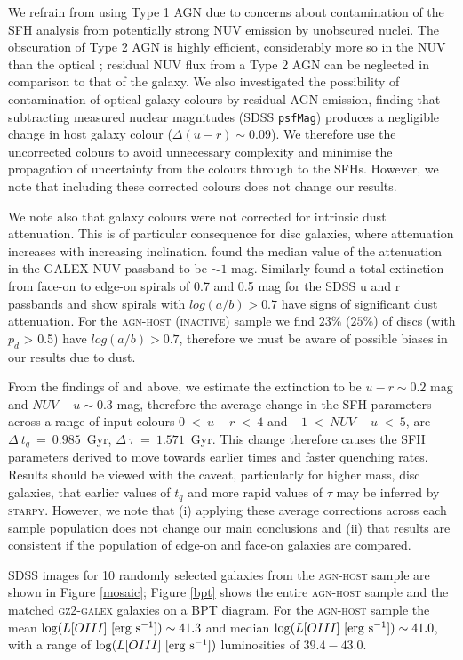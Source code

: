 \documentclass[useAMS,usenatbib]{mn2e}
\def\changed    {\color{nc} }
\def\secondchange    {\color{srv} }
\def\newref    {\color{new} }
\begin{document}
{\changed We refrain from using Type 1 AGN due to concerns about contamination of the SFH analysis from potentially strong NUV emission by unobscured nuclei. The obscuration of Type 2 AGN is highly efficient, considerably more so in the NUV than the optical \citep{Simmons11}; residual NUV flux from a Type 2 AGN can be neglected in comparison to that of the galaxy. We also investigated the possibility of contamination of optical galaxy colours by residual AGN emission, finding that subtracting measured nuclear magnitudes (SDSS {\tt psfMag}) produces a negligible change in host galaxy colour ($\Delta(u-r) \sim 0.09$)}. We therefore use the uncorrected colours to avoid unnecessary complexity and minimise the propagation of uncertainty from the colours through to the SFHs. {\changed However, we note that including these corrected colours does not change our results.}  

{\secondchange We note also that galaxy colours were not corrected for intrinsic dust attenuation. This is of particular consequence for disc galaxies, where attenuation increases with increasing inclination. \cite{Buat05} found the median value of the attenuation in the GALEX NUV passband to be $\sim 1$ mag. Similarly \cite{Masters10} found a total extinction from face-on to edge-on spirals of 0.7 and 0.5 mag for the SDSS u and r passbands and show spirals with $log(a/b) > 0.7$ have signs of significant dust attenuation. For the \textsc{agn-host} (\textsc{inactive}) sample we find $23\%$ ($25\%$) of discs (with $p_d$ > 0.5) have $log(a/b) > 0.7$, therefore we must be aware of possible biases in our results due to dust. 

From the findings of \cite{Masters10} and \cite{Buat05} above, we estimate the extinction to be $u-r \sim 0.2$ mag and $NUV-u \sim 0.3$ mag, therefore the average change in the SFH parameters across a range of input colours $0 ~<~u-r~<~4$ and $-1~<~NUV-u~<~5$,  are $\Delta~t_q~=~0.985$~Gyr, $\Delta~\tau~=~1.571$~Gyr. This change therefore causes the SFH parameters derived to move towards earlier times and faster quenching rates. Results should be viewed with the caveat, particularly for higher mass, disc galaxies, that earlier values of $t_q$ and more rapid values of $\tau$ may be inferred by \textsc{starpy}. However, we note that (i) applying these average corrections across each sample population does not change our main conclusions and {\newref (ii) that results are consistent if the population of edge-on and face-on galaxies are compared.}}

SDSS images for 10 randomly selected galaxies from the \textsc{agn-host} sample are shown in Figure \ref{mosaic}; Figure \ref{bpt} shows the entire \textsc{agn-host} sample and the matched \textsc{gz2-galex} galaxies on a BPT diagram.  For the \textsc{agn-host} sample the mean $\log (L[OIII] ~[\rm{erg~s^{-1}}]) \sim 41.3$ and median $\log (L[OIII] ~[\rm{erg~s^{-1}}]) \sim 41.0$, with a range of $\log (L[OIII] ~[\rm{erg~s^{-1}}])$ luminosities of $39.4-43.0$. 
\end{document}
